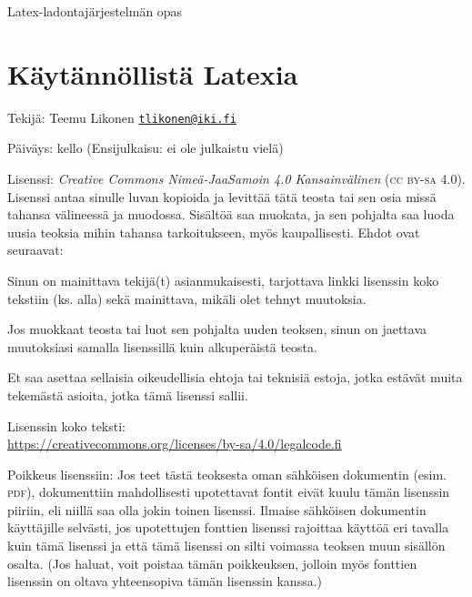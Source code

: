 \documentclass{book}
\newcommand{\kulmasp}[1]
{\href{mailto:#1}{\guilsinglleft\nolinkurl{#1}\guilsinglright}}
\begin{document}
\vfill

{

  \raggedleft
  Latex-ladontajärjestelmän opas \\
  \DTMtoday

}

\clearpage
\restoregeometry
{}

\null\vfill

{
  \setlength{\parindent}{0em}
  \setlength{\parskip}{1.2ex plus .1ex}

  \section*{Käytännöllistä Latexia}

  Tekijä: Teemu Likonen \kulmasp{tlikonen@iki.fi}

  Päiväys: \DTMtoday{} kello \DTMcurrenttime{} (Ensijulkaisu: ei ole
  julkaistu vielä)

  Lisenssi: \emph{Creative Commons Nimeä-Jaa\-Samoin 4.0 Kansainvälinen}
  (\textsc{cc by-sa} 4.0). Lisenssi antaa sinulle luvan kopioida ja
  levittää tätä teosta tai sen osia missä tahansa välineessä ja
  muodossa. Sisältöä saa muokata, ja sen pohjalta saa luoda uusia
  teoksia mihin tahansa tarkoitukseen, myös kaupallisesti. Ehdot ovat
  seuraavat:

  \begin{list}{\textbullet}{
      \setlength{\leftmargin}{1em}
      \setlength{\topsep}{0ex}
      \setlength{\partopsep}{0ex}
      \setlength{\itemsep}{0ex}
    }
  \item Sinun on mainittava tekijä(t) asianmukaisesti, tarjottava linkki
    lisenssin koko tekstiin (ks. alla) sekä mainittava, mikäli olet
    tehnyt muutoksia.
  \item Jos muokkaat teosta tai luot sen pohjalta uuden teoksen, sinun on
    jaettava muutoksiasi samalla lisenssillä kuin alkuperäistä teosta.
  \item Et saa asettaa sellaisia oikeudellisia ehtoja tai teknisiä
    estoja, jotka estävät muita tekemästä asioita, jotka tämä lisenssi
    sallii.
  \end{list}

  Lisenssin koko teksti: \\
  \url{https://creativecommons.org/licenses/by-sa/4.0/legalcode.fi}

  Poikkeus lisenssiin: Jos teet tästä teoksesta oman sähköisen
  dokumentin (esim. \textsc{pdf}), dokumenttiin mahdollisesti
  upotettavat fontit eivät kuulu tämän lisenssin piiriin, eli niillä saa
  olla jokin toinen lisenssi. Ilmaise sähköisen dokumentin käyttäjille
  selvästi, jos upotettujen fonttien lisenssi rajoittaa käyttöä eri
  tavalla kuin tämä lisenssi ja että tämä lisenssi on silti voimassa
  teoksen muun sisällön osalta. (Jos haluat, voit poistaa tämän
  poikkeuksen, jolloin myös fonttien lisenssin on oltava yhteensopiva
  tämän lisenssin kanssa.)

}
\end{document}
